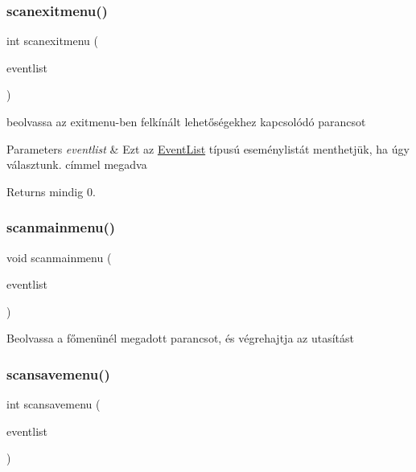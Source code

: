 \subsubsection{\texorpdfstring{scanexitmenu()}{scanexitmenu()}}
{\footnotesize\ttfamily int scanexitmenu (\begin{DoxyParamCaption}\item[{\hyperlink{struct_event_list}{Event\+List} $\ast$}]{eventlist }\end{DoxyParamCaption})}

beolvassa az exitmenu-\/ben felkínált lehetőségekhez kapcsolódó parancsot 
\begin{DoxyParams}{Parameters}
{\em eventlist} & Ezt az \hyperlink{struct_event_list}{Event\+List} típusú eseménylistát menthetjük, ha úgy választunk. címmel megadva \\
\hline
\end{DoxyParams}
\begin{DoxyReturn}{Returns}
mindig 0. 
\end{DoxyReturn}
\mbox{\label{group__menu_ga8e572ab27981dcd7144340fd25a24c80}} 
\subsubsection{\texorpdfstring{scanmainmenu()}{scanmainmenu()}}
{\footnotesize\ttfamily void scanmainmenu (\begin{DoxyParamCaption}\item[{\hyperlink{struct_event_list}{Event\+List} $\ast$}]{eventlist }\end{DoxyParamCaption})}

Beolvassa a főmenünél megadott parancsot, és végrehajtja az utasítást \mbox{\label{group__menu_gadaafbda0a45084d074a4d210ec37efac}} 
\subsubsection{\texorpdfstring{scansavemenu()}{scansavemenu()}}
{\footnotesize\ttfamily int scansavemenu (\begin{DoxyParamCaption}\item[{\hyperlink{struct_event_list}{Event\+List} const $\ast$}]{eventlist }\end{DoxyParamCaption})}

